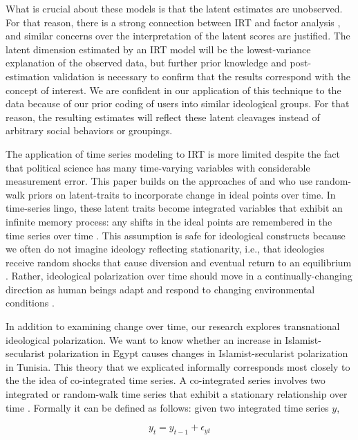 \documentclass[12pt]{article}
\begin{document}
What is crucial about these models is that the latent estimates are unobserved. For that reason, there is a strong connection between IRT and factor analysis \parencite{takane1986}, and similar concerns over the interpretation of the latent scores are justified. The latent dimension estimated by an IRT model will be the lowest-variance explanation of the observed data, but further prior knowledge and post-estimation validation is necessary to confirm that the results correspond with the concept of interest. We are confident in our application of this technique to the data because of our prior coding of users into similar ideological groups. For that reason, the resulting estimates will reflect these latent cleavages instead of arbitrary social behaviors or groupings.

The application of time series modeling to IRT is more limited despite the fact that political science has many time-varying variables with considerable measurement error. This paper builds on the approaches of \textcite{quinn2002} and \textcite{kropko2013} who use random-walk priors on latent-traits to incorporate change in ideal points over time. In time-series lingo, these latent traits become integrated variables that exhibit an infinite memory process: any shifts in the ideal points are remembered in the time series over time \parencite[Ch. 5]{timeseries2014}. This assumption is safe for ideological constructs because we often do not imagine ideology reflecting stationarity, i.e., that ideologies receive random shocks that cause diversion and eventual return to an equilibrium \parencite[Ch. 2]{timeseries2014}. Rather, ideological polarization over time should move in a continually-changing direction as human beings adapt and respond to changing environmental conditions \parencite{owen2010clash}.

In addition to examining change over time, our research explores transnational ideological polarization. We want to know whether an increase in Islamist-secularist polarization in Egypt causes changes in Islamist-secularist polarization in Tunisia. This theory that we explicated informally corresponds most closely to the the idea of co-integrated time series. A co-integrated series involves two integrated or random-walk time series that exhibit a stationary relationship over time \parencite{engle1987}. Formally it can be defined as follows: given two integrated time series  $y$,

\begin{equation}
	y_t = y_{t-1} + \epsilon_{yt}
\end{equation}
\end{document}
